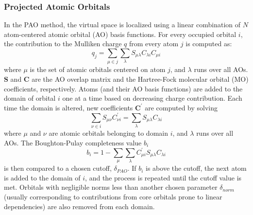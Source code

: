 \subsubsection{Projected Atomic Orbitals} \label{sss:pao}
In the PAO method, the virtual space is localized using a linear combination of $N$ atom-centered 
atomic orbital (AO) basis functions. For every occupied orbital $i$, the contribution to the 
Mulliken charge $q$ from every atom $j$ is computed as:
\begin{equation}
    q_j = \sum_{\mu\in j}\sum_\lambda S_{\mu\lambda}C_{\lambda i}C_{\mu i}
\end{equation}
where $\mu$ is the set of atomic orbitals centered on atom $j$, and $\lambda$ runs over all AOs.
$\textbf{S}$ and $\textbf{C}$ are the AO overlap matrix and 
the Hartree-Fock molecular orbital (MO) coefficients, respectively.
Atoms (and their AO basis functions) are 
added to the domain of orbital $i$ one at a time based on decreasing charge contribution. 
Each time the domain is altered, new coefficients $\textbf{C}^{\prime}$ are computed by solving
\begin{equation}
    \sum_{\nu\in i}S_{\mu\nu}C^{\prime}_{\nu i} = \sum_{\lambda}S_{\mu\lambda}C_{\lambda i}
\end{equation}
where $\mu$ and $\nu$ are atomic orbitals belonging to domain ${i}$, and $\lambda$
runs over all AOs.
The Boughton-Pulay completeness value $b_i$ 
\begin{equation}
    b_i = 1 - \sum_{\mu}\sum_{\lambda}C^{\prime}_{\mu i}S_{\mu\lambda}C_{\lambda i}
\end{equation}
is then compared to a chosen cutoff, $\delta_{PAO}$. If $b_i$ is above the cutoff, the 
next atom is added to the domain of $i$, and the process is repeated until the cutoff value
is met. Orbitals with negligible norms less than another chosen parameter $\delta_{norm}$
(usually corresponding to contributions from core orbitals prone to linear dependencies)
are also removed from each domain.

